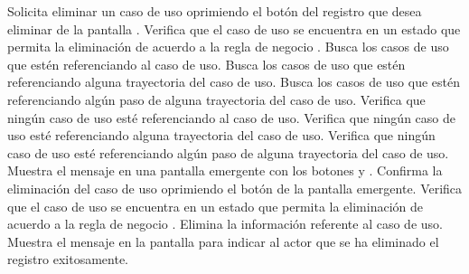  \begin{UCtrayectoria}
    \UCpaso[\UCactor] Solicita eliminar un caso de uso oprimiendo el botón \btnEliminar del registro que desea eliminar de la pantalla .
    \UCpaso[\UCsist] Verifica que el caso de uso se encuentra en un estado que permita la eliminación de acuerdo a la regla de negocio . 
    \UCpaso[\UCsist] Busca los casos de uso que estén referenciando al caso de uso.
    \UCpaso[\UCsist] Busca los casos de uso que estén referenciando alguna trayectoria del caso de uso.
    \UCpaso[\UCsist] Busca los casos de uso que estén referenciando algún paso de alguna trayectoria del caso de uso.
    \UCpaso[\UCsist] Verifica que ningún caso de uso esté referenciando al caso de uso. 
    \UCpaso[\UCsist] Verifica que ningún caso de uso esté referenciando alguna trayectoria del caso de uso. 
    \UCpaso[\UCsist] Verifica que ningún caso de uso esté referenciando algún paso de alguna trayectoria del caso de uso. 
    \UCpaso[\UCsist] Muestra el mensaje  en una pantalla emergente con los botones  y .
    \UCpaso[\UCactor] Confirma la eliminación del caso de uso oprimiendo el botón  de la pantalla emergente. 
    \UCpaso[\UCsist] Verifica que el caso de uso se encuentra en un estado que permita la eliminación de acuerdo a la regla de negocio . 
    \UCpaso[\UCsist] Elimina la información referente al caso de uso.
    \UCpaso[\UCsist] Muestra el mensaje  en la pantalla 
    para indicar al actor que se ha eliminado el registro exitosamente.
 \end{UCtrayectoria}
 

